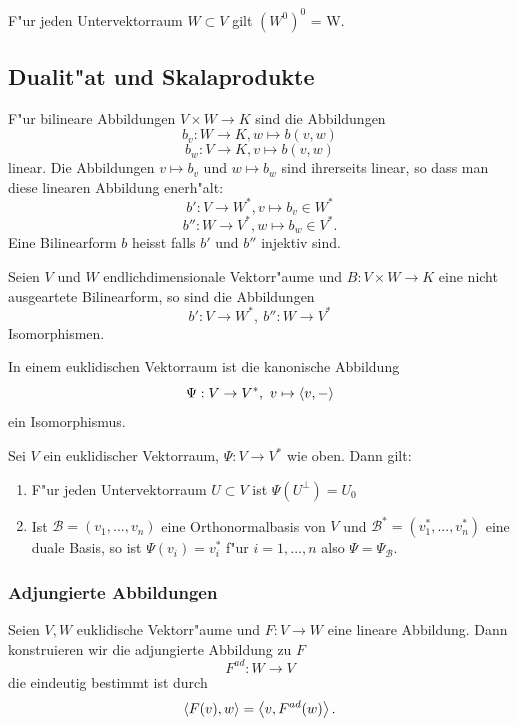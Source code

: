 \documentclass[11pt, a4paper]{article}
\begin{document}
\begin{remark}
F"ur jeden Untervektorraum $W \subset V$ gilt $(W^0)^0$ = W.
\end{remark}

\subsection{Dualit"at und Skalaprodukte}
\begin{definition}
F"ur bilineare Abbildungen $V \times W \rightarrow K$ sind die Abbildungen
$$
b_v : W \rightarrow K, w \mapsto b(v, w)
$$
$$
b_w : V \rightarrow K, v \mapsto b(v, w)
$$
linear. Die Abbildungen $v \mapsto b_v$ und $w \mapsto b_w$ sind ihrerseits linear, so dass man diese linearen Abbildung enerh"alt:
$$
b ' : V \rightarrow W^*, v \mapsto b_v \in W^*
$$
$$
b '' : W \rightarrow V^*, w \mapsto b_w \in V^*.
$$
Eine Bilinearform $b$ heisst  falls $b'$ und $b''$ injektiv sind.
\end{definition}

\begin{theorem}
Seien $V$ und $W$ endlichdimensionale Vektorr"aume und $B : V \times W \rightarrow K$ eine nicht ausgeartete Bilinearform, so sind die Abbildungen 
$$
b': V \rightarrow W^*, \ b'':W \rightarrow V^*
$$
Isomorphismen.
\end{theorem}

\begin{corollary}
In einem euklidischen Vektorraum ist die kanonische Abbildung
$$
\Psi : V \rightarrow V^*, \ 
v \mapsto \scp{v}{-}
$$
ein Isomorphismus.
\end{corollary}

\begin{theorem}
Sei $V$ ein euklidischer Vektorraum, $\Psi : V \rightarrow V^*$ wie oben. Dann gilt:
\begin{enumerate}
\item F"ur jeden Untervektorraum $U \subset V$ ist $\Psi(U^\perp) = U_0$
\item Ist $\mathcal{B} = (v_1, ..., v_n)$ eine Orthonormalbasis von $V$ und $\mathcal{B}^* = (v_1^*, ..., v_n^*)$ eine duale Basis, so ist $\Psi(v_i) = v_i^*$ f"ur $i = 1, ..., n$ also $\Psi = \Psi_\mathcal{B}$.
\end{enumerate}
\end{theorem}

\subsubsection{Adjungierte Abbildungen}
\begin{definition}
Seien $V, W$ euklidische Vektorr"aume und $F : V \rightarrow W$ eine lineare Abbildung. Dann konstruieren wir die adjungierte Abbildung zu $F$
$$
F^{ad} : W \rightarrow V
$$
die eindeutig bestimmt ist durch
$$
\left\langle {F(v)} , {w} \right\rangle = \left\langle {v} , {F^{ad}(w)} \right\rangle.
$$
\end{definition}
\end{document}
